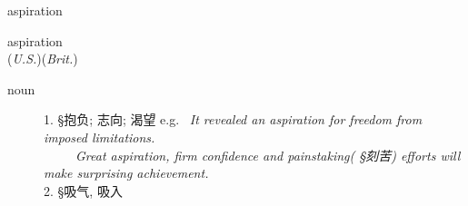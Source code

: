 \documentclass[avery5372, grid]{flashcards}
\begin{document}
\begin{flashcard}[{\B  7 Habits} {\S 词汇}]{\Huge aspiration}
	\begin{center}
		{\LARGE as\textbullet pi\textbullet ra\textbullet tion}\\
		(\textit{U.S.})\hspace{0.25cm}(\textit{Brit.})
	\end{center}
	\begin{description}
		
			
			
			
		
		\item[noun] %
			1. {\S 抱负; 志向; 渴望} e.g. \textbullet\ \textit{It revealed an aspiration for freedom from imposed limitations.}\\
			\ \ \ \ \textbullet\ \textit{Great aspiration, firm confidence and painstaking\textnormal{( {\S 刻苦})} efforts will make surprising achievement.}\\
			2. {\S 吸气, 吸入}
						
		
			

\end{description}
\end{flashcard}
\end{document}

